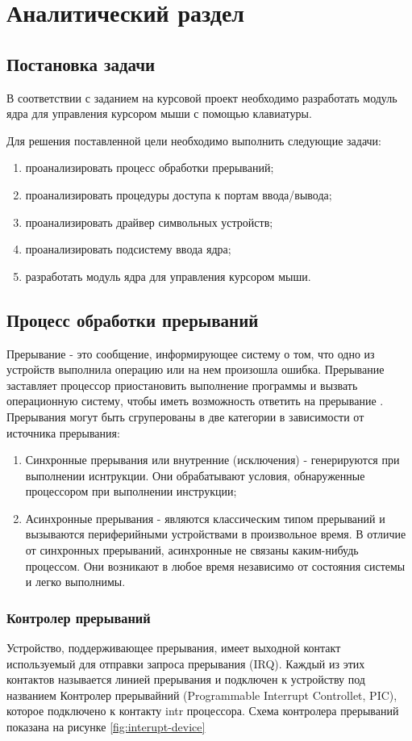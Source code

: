 \section{Аналитический раздел}


\subsection{Постановка задачи}
В соответствии с заданием на курсовой проект необходимо разработать модуль ядра для управления курсором мыши с помощью клавиатуры.

Для решения поставленной цели необходимо выполнить следующие задачи:
\begin{enumerate}
	\item проанализировать процесс обработки прерываний;
	\item проанализировать процедуры доступа к портам ввода/вывода;
	\item проанализировать драйвер символьных устройств;
	\item проанализировать подсистему ввода ядра;
	\item разработать модуль ядра для управления курсором мыши.
\end{enumerate}

\subsection{Процесс обработки прерываний}
Прерывание - это сообщение, информирующее систему о том, что одно из устройств выполнила операцию или на нем произошла ошибка. 
Прерывание заставляет процессор приостановить выполнение программы и вызвать операционную систему, чтобы иметь возможность ответить на прерывание \cite{3}.
Прерывания могут быть сгруперованы в две категории в зависимости от источника прерывания:
\begin{enumerate}
	\item Синхронные прерывания или внутренние (исключения) - генерируются при выполнении иснтрукции.
	Они обрабатывают условия, обнаруженные процессором при выполнении инструкции;
	\item Асинхронные прерывания - являются классическим типом прерываний и вызываются периферийными устройствами в произвольное время. 
	В отличие от синхронных прерываний, асинхронные не связаны каким-нибудь процессом. 
	Они возникают в любое время независимо от состояния системы и легко выполнимы.
\end{enumerate}

\subsubsection{Контролер прерываний}
Устройство, поддерживающее прерывания, имеет выходной контакт используемый для отправки запроса прерывания (IRQ). 
Каждый из этих контактов называется линией прерывания и подключен к устройству под названием Контролер прерывайний (Programmable Interrupt Controllet, PIC), которое подключено к контакту intr процессора. Схема контролера прерываний показана на рисунке \ref{fig:interupt-device}

